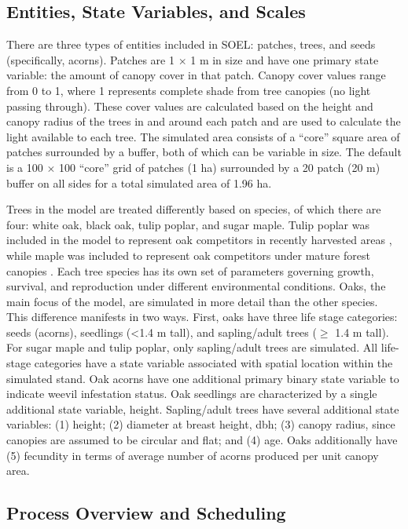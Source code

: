 \documentclass[
11pt, %
a4paper, %
oneside, %
headinclude,footinclude, %
]{scrartcl}
\begin{document}
\subsection{Entities, State Variables, and Scales}

There are three types of entities included in SOEL: patches, trees, and seeds (specifically, acorns). Patches are 1 $\times$ 1 m in size and have one primary state variable: the amount of canopy cover in that patch. Canopy cover values range from 0 to 1, where 1 represents complete shade from tree canopies (no light passing through). These cover values are calculated based on the height and canopy radius of the trees in and around each patch and are used to calculate the light available to each tree. The simulated area consists of a “core” square area of patches surrounded by a buffer, both of which can be variable in size. The default is a 100 $\times$ 100 “core” grid of patches (1 ha) surrounded by a 20 patch (20 m) buffer on all sides for a total simulated area of 1.96 ha.

Trees in the model are treated differently based on species, of which there are four: white oak, black oak, tulip poplar, and sugar maple. Tulip poplar was included in the model to represent oak competitors in recently harvested areas \citep{Jenkins1998}, while maple was included to represent oak competitors under mature forest canopies \citep{Nowacki2008}. Each tree species has its own set of parameters governing growth, survival, and reproduction under different environmental conditions. Oaks, the main focus of the model, are simulated in more detail than the other species. This difference manifests in two ways. First, oaks have three life stage categories: seeds (acorns), seedlings (\textless 1.4 m tall), and sapling/adult trees ($\geq$ 1.4 m tall). For sugar maple and tulip poplar, only sapling/adult trees are simulated. All life-stage categories have a state variable associated with spatial location within the simulated stand. Oak acorns have one additional primary binary state variable to indicate weevil infestation status. Oak seedlings are characterized by a single additional state variable, height. Sapling/adult trees have several additional state variables: (1) height; (2) diameter at breast height, dbh; (3) canopy radius, since canopies are assumed to be circular and flat; and (4) age. Oaks additionally have (5) fecundity in terms of average number of acorns produced per unit canopy area.

\subsection{Process Overview and Scheduling}
\end{document}
